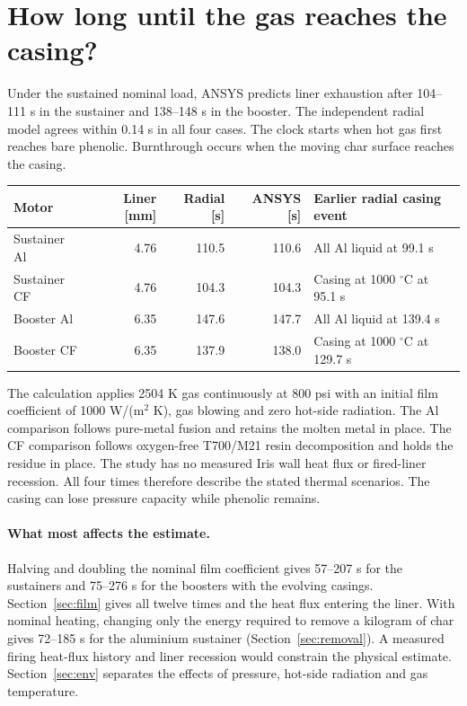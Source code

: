 
\section*{How long until the gas reaches the casing?}
Under the sustained nominal load, ANSYS predicts liner exhaustion after
104--111 s in the sustainer and 138--148 s in the booster. The independent
radial model agrees within 0.14 s in all four cases. The clock starts when hot gas first reaches bare phenolic.
Burnthrough occurs when the moving char surface reaches the casing.
\begin{table}[H]\centering
\small\begin{tabular}{lrrrl}\toprule
Motor & Liner [mm] & Radial [s] & ANSYS [s] & Earlier radial casing event \\\midrule
Sustainer Al & 4.76 & 110.5 & 110.6 & All Al liquid at 99.1 s \\
Sustainer CF & 4.76 & 104.3 & 104.3 & Casing at 1000 $^\circ$C at 95.1 s \\
Booster Al & 6.35 & 147.6 & 147.7 & All Al liquid at 139.4 s \\
Booster CF & 6.35 & 137.9 & 138.0 & Casing at 1000 $^\circ$C at 129.7 s \\
\bottomrule\end{tabular}
\end{table}
The calculation applies 2504 K gas continuously at 800 psi with an initial
film coefficient of 1000 W/(m$^2$ K), gas blowing and zero hot-side radiation.
The Al comparison follows pure-metal fusion and retains the molten metal in
place. The CF comparison follows oxygen-free T700/M21 resin decomposition
and holds the residue in place. The study has no measured Iris wall heat flux
or fired-liner recession. All four times therefore describe the stated thermal
scenarios. The casing can lose pressure capacity while phenolic remains.

\paragraph{What most affects the estimate.}
Halving and doubling the nominal film coefficient gives 57--207 s for
the sustainers and 75--276 s for the boosters with the evolving casings.
Section~\ref{sec:film} gives all twelve times and the heat flux entering the
liner. With nominal heating, changing only the energy required to remove a
kilogram of char gives 72--185 s for the aluminium sustainer
(Section~\ref{sec:removal}). A measured firing heat-flux history
and liner recession would constrain the physical estimate. Section~\ref{sec:env}
separates the effects of pressure, hot-side radiation and gas temperature.

